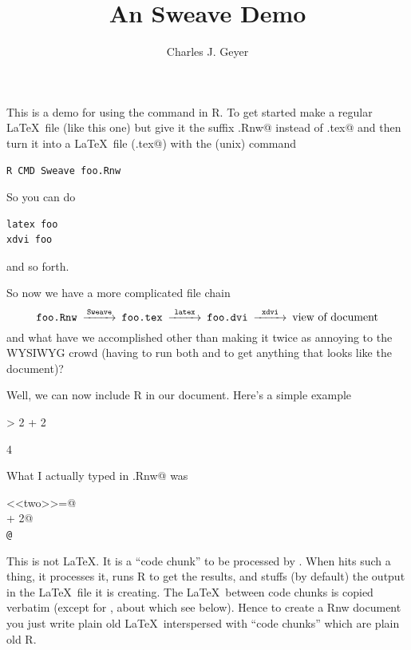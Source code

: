\documentclass{article}
\begin{document}
\title{An Sweave Demo}
\author{Charles J. Geyer}
\maketitle

This is a demo for using the \verb@Sweave@ command in R.  To
get started make a regular \LaTeX\ file (like this one) but
give it the suffix \verb@.Rnw@ instead of \verb@.tex@ and then
turn it into a \LaTeX\ file (\verb@foo.tex@) with the (unix) command
\begin{verbatim}
R CMD Sweave foo.Rnw
\end{verbatim}
So you can do
\begin{verbatim}
latex foo
xdvi foo
\end{verbatim}
and so forth.

So now we have a more complicated file chain
$$
\begin{CD}
   \texttt{foo.Rnw}
   @>\texttt{Sweave}>>
   \texttt{foo.tex}
   @>\texttt{latex}>>
   \texttt{foo.dvi}
   @>\texttt{xdvi}>>
   \text{view of document}
\end{CD}
$$
and what have we accomplished other than making it twice as annoying
to the WYSIWYG crowd (having to run both \verb@Sweave@ and \verb@latex@
to get anything that looks like the document)?

Well, we can now include R in our document.  Here's a simple example
\begin{Schunk}
\begin{Sinput}
> 2 + 2
\end{Sinput}
\begin{Soutput}
[1] 4
\end{Soutput}
\end{Schunk}
What I actually typed in \verb@foo.Rnw@ was
\begin{tabbing}
\verb@<<two>>=@ \\
 + 2@ \\
\verb+@+ \\
\end{tabbing}
This is not \LaTeX.  It is a ``code chunk'' to be processed by \verb@Sweave@.
When \verb@Sweave@ hits such a thing, it processes it, runs R to get the
results, and stuffs (by default) the output in the \LaTeX\ file it is
creating.  The \LaTeX\ between code chunks is copied verbatim (except
for \verb@Sexpr@, about which see below).  Hence to create a Rnw document
you just write plain old \LaTeX\ interspersed with ``code chunks'' which
are plain old R.
\end{document}
